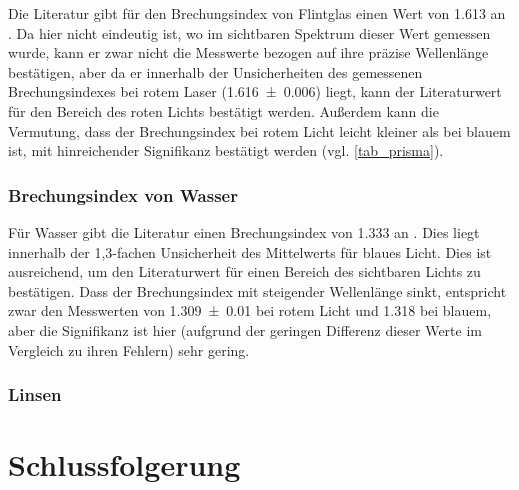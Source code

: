 \documentclass[
	a4paper,
	12pt,
	pagesize,
	ngerman
]{scrartcl}
\begin{document}
	Die Literatur gibt für den Brechungsindex von Flintglas einen Wert von \SI{1,613}{} an \cite{flintglasref}.
	Da hier nicht eindeutig ist, wo im sichtbaren Spektrum dieser Wert gemessen wurde, kann er zwar nicht die Messwerte bezogen auf ihre präzise Wellenlänge bestätigen, aber da er innerhalb der Unsicherheiten des gemessenen Brechungsindexes bei rotem Laser (\SI{1,616 \pm 0,006}{}) liegt, kann der Literaturwert für den Bereich des roten Lichts bestätigt werden.
	Außerdem kann die Vermutung, dass der Brechungsindex bei rotem Licht leicht kleiner als bei blauem ist, mit hinreichender Signifikanz bestätigt werden (vgl. \cref{tab_prisma}).
	
	\subsubsection{Brechungsindex von Wasser}
	Für Wasser gibt die Literatur einen Brechungsindex von \SI{1,333}{} an \cite{flintglasref}.
	Dies liegt innerhalb der 1,3-fachen Unsicherheit des Mittelwerts für blaues Licht.
	Dies ist ausreichend, um den Literaturwert für einen Bereich des sichtbaren Lichts zu bestätigen.
	Dass der Brechungsindex mit steigender Wellenlänge sinkt, entspricht zwar den Messwerten von \SI{1,309\pm 0,01}{} bei rotem Licht und \SI{1,318}{} bei blauem, aber die Signifikanz ist hier (aufgrund der geringen Differenz dieser Werte im Vergleich zu ihren Fehlern) sehr gering. %
	
	\subsubsection{Linsen}
	
	
	\section{Schlussfolgerung}
	
	\printbibliography
\end{document}
